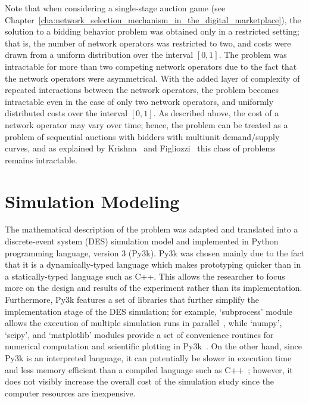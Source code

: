 Note that when considering a single-stage auction game (see Chapter~\ref{cha:network_selection_mechanism_in_the_digital_marketplace}), the solution to a bidding behavior problem was obtained only in a restricted setting; that is, the number of network operators was restricted to two, and costs were drawn from a uniform distribution over the interval $[0,1]$. The problem was intractable for more than two competing network operators due to the fact that the network operators were asymmetrical. With the added layer of complexity of repeated interactions between the network operators, the problem becomes intractable even in the case of only two network operators, and uniformly distributed costs over the interval $[0,1]$. As described above, the cost of a network operator may vary over time; hence, the problem can be treated as a problem of sequential auctions with bidders with multiunit demand/supply curves, and as explained by Krishna~\cite{Krishna10} and Figliozzi~\cite{FigliozziJaillet2008} this class of problems remains intractable.

\section{Simulation Modeling} %
\label{sec:simulation_modeling_dynamic}
The mathematical description of the problem was adapted and translated into a discrete-event system (DES) simulation model and implemented in Python programming language, version 3 (Py3k). Py3k was chosen mainly due to the fact that it is a dynamically-typed language which makes prototyping quicker than in a statically-typed language such as C++. This allows the researcher to focus more on the design and results of the experiment rather than its implementation. Furthermore, Py3k features a set of libraries that further simplify the implementation stage of the DES simulation; for example, `subprocess' module allows the execution of multiple simulation runs in parallel~\cite{Py3kSubprocess}, while `numpy', `scipy', and `matplotlib' modules provide a set of convenience routines for numerical computation and scientific plotting in Py3k~\cite{Numpy, Scipy, Matplotlib}. On the other hand, since Py3k is an interpreted language, it can potentially be slower in execution time and less memory efficient than a compiled language such as C++~\cite{Py3kC++}; however, it does not visibly increase the overall cost of the simulation study since the computer resources are inexpensive.

